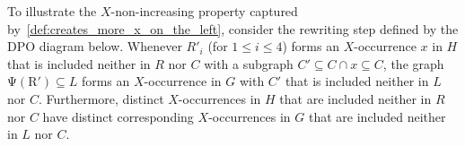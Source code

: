 \begin{example}
    To illustrate the $X$-non-increasing property captured by~\autoref{def:creates_more_x_on_the_left},
    consider the rewriting step defined by the DPO diagram below. Whenever \( R'_i \) (for \( 1 \leq i \leq 4 \)) forms an \( X \)-occurrence $x$ in $H$ that is included neither in \( R \) nor $C$ with a subgraph $C' \subseteq C \cap x \subseteq C$, the graph
    \( \operatorname{\Psi(R')} \subseteq L\) forms an \( X \)-occurrence in $G$ with $C'$ that is included neither in \( L \) nor $C$.
    Furthermore, distinct $X$-occurrences in $H$ that are included neither in \( R \) nor $C$ have distinct corresponding $X$-occurrences in $G$ that are included neither in \( L \) nor $C$.

\end{example}
